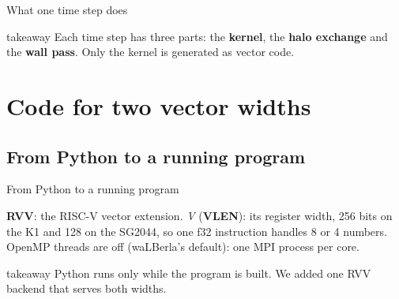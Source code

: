 \documentclass[aspectratio=169,10pt,t]{beamer}
\newcommand{\term}[1]{\textcolor{psblue!85!black}{\textbf{#1}}} %
\newcommand{\takeaway}[1]{\par\vfill
  \begin{beamercolorbox}[wd=\textwidth,sep=4pt,rounded=true]{takeaway}
    \small #1
  \end{beamercolorbox}}
\begin{document}
\begin{frame}{What one time step does}
  \vspace{1.5mm}
  \centering
  \takeaway{Each time step has three parts: the \term{kernel}, the \term{halo exchange} and the \term{wall pass}.
    Only the kernel is generated as vector code.}
\end{frame}

\section[Code for two widths]{Code for two vector widths}
\subsection{From Python to a running program}

\begin{frame}{From Python to a running program}
  \vspace{1mm}
  \centering

  \vspace{1mm}
  \raggedright{\scriptsize\color{psgray}\term{RVV}: the RISC-V vector extension. \textit{V} (\term{VLEN}): its
  register width, 256 bits on the K1 and 128 on the SG2044, so one f32 instruction handles 8 or 4 numbers.
  OpenMP threads are off (waLBerla's default): one MPI process per core.\par}
  \takeaway{Python runs only while the program is built. We added one RVV backend that serves both widths.}
\end{frame}

\end{document}

